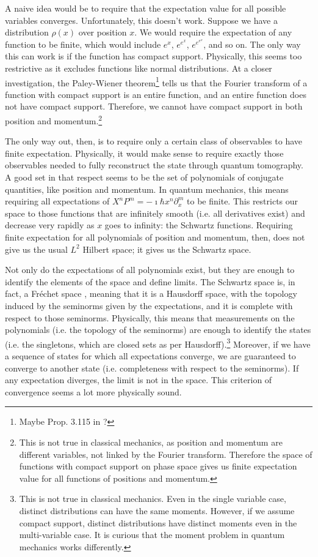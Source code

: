 \documentclass[10pt,twocolumn, nofootinbib]{revtex4-2}
\begin{document}
A naive idea would be to require that the expectation value for all possible variables converges. Unfortunately, this doesn't work. Suppose we have a distribution $\rho(x)$ over position $x$. We would require the expectation of any function to be finite, which would include $e^x$, $e^{e^x}$, $e^{e^{e^x}}$, and so on. The only way this can work is if the function has compact support. Physically, this seems too restrictive as it excludes functions like normal distributions. At a closer investigation, the Paley-Wiener theorem\cite{fourierCompact}\footnote{Maybe Prop. 3.115 in \cite{moretti_spectral_2017}?} tells us that the Fourier transform of a function with compact support is an entire function, and an entire function does not have compact support.\cite{markushevich2014entire} Therefore, we cannot have compact support in both position and momentum.\footnote{This is not true in classical mechanics, as position and momentum are different variables, not linked by the Fourier transform. Therefore the space of functions with compact support on phase space gives us finite expectation value for all functions of positions and momentum.}

The only way out, then, is to require only a certain class of observables to have finite expectation. Physically, it would make sense to require exactly those observables needed to fully reconstruct the state through quantum tomography. A good set in that respect seems to be the set of polynomials of conjugate quantities, like position and momentum. In quantum mechanics, this means requiring all expectations of $X^nP^m = -\imath \hbar x^n\partial_x ^m$ to be finite. This restricts our space to those functions that are infinitely smooth (i.e. all derivatives exist) and decrease very rapidly as $x$ goes to infinity: the Schwartz functions. Requiring finite expectation for all polynomials of position and momentum, then, does not give us the usual $L^2$ Hilbert space; it gives us the Schwartz space.

Not only do the expectations of all polynomials exist, but they are enough to identify the elements of the space and define limits. The Schwartz space is, in fact, a Fréchet space \cite[Theorem V.9]{reed_methods_1980}, meaning that it is a Hausdorff space, with the topology induced by the seminorms given by the expectations, and it is complete with respect to those seminorms. Physically, this means that measurements on the polynomials (i.e. the topology of the seminorms) are enough to identify the states (i.e. the singletons, which are closed sets as per Hausdorff).\footnote{This is not true in classical mechanics. Even in the single variable case, distinct distributions can have the same moments. However, if we assume compact support, distinct distributions have distinct moments even in the multi-variable case.\cite{moment_problem_2017} It is curious that the moment problem in quantum mechanics works differently.} Moreover, if we have a sequence of states for which all expectations converge, we are guaranteed to converge to another state (i.e. completeness with respect to the seminorms). If any expectation diverges, the limit is not in the space. This criterion of convergence seems a lot more physically sound.
\end{document}
